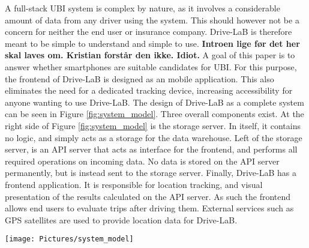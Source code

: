 A full-stack UBI system is complex by nature, as it involves a considerable amount of data from any driver using the system. This should however not be a concern for neither the end user or insurance company. Drive-LaB is therefore meant to be simple to understand and simple to use. \textbf{Introen lige før det her skal laves om. Kristian forstår den ikke. Idiot.}
A goal of this paper is to answer whether smartphones are suitable candidates for UBI. For this purpose, the frontend of Drive-LaB is designed as an mobile application. This also eliminates the need for a dedicated tracking device, increasing accessibility for anyone wanting to use Drive-LaB.
The design of Drive-LaB as a complete system can be seen in Figure \ref{fig:system_model}. Three overall components exist. At the right side of Figure \ref{fig:system_model}  is the storage server. In itself, it contains no logic, and simply acts as a storage for the data warehouse. Left of the storage server, is an API server that acts as interface for the frontend, and performs all required operations on incoming data. No data is stored on the API server permanently, but is instead sent to the storage server. Finally, Drive-LaB has a frontend application. It is responsible for location tracking, and visual presentation of the results calculated on the API server. As such the frontend allows end users to evaluate trips after driving them. External services such as GPS satellites are used to provide location data for Drive-LaB.

\begin{figure*}[tb]
\centering
\texttt{[image: Pictures/system\_model]}
\caption{Composition of the system}
\label{fig:system_model}
\end{figure*}